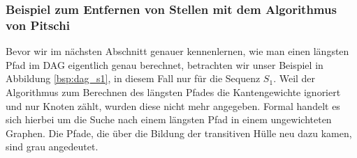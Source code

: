 \subsubsection{Beispiel zum Entfernen von Stellen mit dem Algorithmus von Pitschi}

Bevor wir im nächsten Abschnitt genauer kennenlernen, wie man einen längsten Pfad im DAG eigentlich genau berechnet, betrachten wir unser Beispiel in Abbildung \ref{bsp:dag_s1}, in diesem Fall nur für die Sequenz $S_1$. Weil der Algorithmus zum Berechnen des längsten Pfades die Kantengewichte ignoriert und nur Knoten zählt, wurden diese nicht mehr angegeben. Formal handelt es sich hierbei um die Suche nach einem längsten Pfad in einem ungewichteten Graphen. Die Pfade, die über die Bildung der transitiven Hülle neu dazu kamen, sind grau angedeutet.

